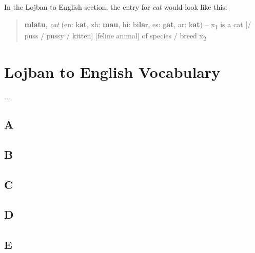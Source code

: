 \documentclass[12pt]{book}
\begin{document}
In the Lojban to English section, the entry for \emph{cat} would look like this:


\begin{quote}
\textbf{mlatu}, \textit{cat} (en: k\textbf{at}, zh: \textbf{mau}, hi: bi\textbf{la}r, es: g\textbf{at}, ar: k\textbf{at}) -- x\textsubscript{1} is a cat [/ puss / pussy / kitten] [feline animal] of species / breed x\textsubscript{2}
\end{quote}


\section{Lojban to English Vocabulary}

...

\subsection{A} %

\begin{description}
\item[ ]
\end{description}

\subsection{B} %

\begin{description}
\item[ ]
\end{description}

\subsection{C} %

\begin{description}
\item[ ]
\end{description}

\subsection{D} %

\begin{description}
\item[ ]
\end{description}

\subsection{E} %
\end{document}
